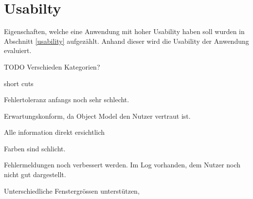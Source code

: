 \section{Usabilty}\label{evalUsabilty}
Eigenschaften, welche eine Anwendung mit hoher Usability haben soll wurden in Abschnitt \ref{usability} aufgezählt.
Anhand dieser wird die Usability der Anwendung evaluiert.



TODO
Verschieden Kategorien?

short cuts

Fehlertoleranz anfangs noch sehr schlecht.

Erwartungskonform, da Object Model den Nutzer vertraut ist.

Alle information direkt ersichtlich

Farben sind schlicht.

Fehlermeldungen noch verbessert werden.
Im Log vorhanden, dem Nutzer noch nicht gut dargestellt.

Unterschiedliche Fenstergrössen unterstützen,